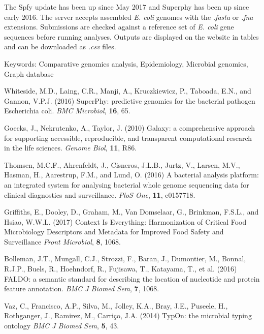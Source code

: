 \documentclass[a4paper, onecolumn]{NAR}
\begin{document}
The Spfy update has been up since May 2017 and Superphy has been up since early 2016. The server accepts assembled \textit{E. coli} genomes with the \textit{.fasta} or \textit{.fna} extensions. Submissions are checked against a reference set of \textit{E. coli} gene sequences before running analyses. Outputs are displayed on the website in tables and can be downloaded as \textit{.csv} files. 
\par

Keywords: Comparative genomics analysis, Epidemiology, Microbial genomics, Graph database

\newpage

\begin{thebibliography}{4}

Whiteside, M.D., Laing, C.R., Manji, A., Kruczkiewicz, P., Taboada, E.N., and Gannon, V.P.J. (2016)
SuperPhy: predictive genomics for the bacterial pathogen Escherichia coli.
\textit{BMC Microbiol}, \textbf{16}, 65.

Goecks, J., Nekrutenko, A., Taylor, J. (2010)
Galaxy: a comprehensive approach for supporting accessible, reproducible, and transparent computational research in the life sciences.
\textit{Genome Biol}, \textbf{11}, R86.

Thomsen, M.C.F., Ahrenfeldt, J., Cisneros, J.L.B., Jurtz, V., Larsen, M.V., Hasman, H., Aarestrup, F.M., and Lund, O. (2016)
A bacterial analysis platform: an integrated system for analysing bacterial whole genome sequencing data for clinical diagnostics and surveillance.
\textit{PloS One}, \textbf{11}, e0157718.

Griffiths, E., Dooley, D., Graham, M., Van Domselaar, G., Brinkman, F.S.L., and Hsiao, W.W.L. (2017)
Context Is Everything: Harmonization of Critical Food Microbiology Descriptors and Metadata for Improved Food Safety and Surveillance
\textit{Front Microbiol}, \textbf{8}, 1068.

Bolleman, J.T., Mungall, C.J., Strozzi, F., Baran, J., Dumontier, M., Bonnal, R.J.P., Buels, R., Hoehndorf, R., Fujisawa, T., Katayama, T., et al. (2016)
FALDO: a semantic standard for describing the location of nucleotide and protein feature annotation.
\textit{BMC J Biomed Sem}, \textbf{7}, 1068.

Vaz, C., Francisco, A.P., Silva, M., Jolley, K.A., Bray, J.E., Puseele, H., Rothganger, J., Ramirez, M., Carri\c{c}o, J.A. (2014)
TypOn: the microbial typing ontology
\textit{BMC J Biomed Sem}, \textbf{5}, 43.

\end{thebibliography}
\end{document}
